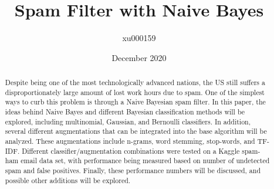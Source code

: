 \documentclass{article}
\title{Spam Filter with Naive Bayes}
\author{xu000159 }
\date{December 2020}
\begin{document}
\maketitle

\begin{abstract}
   Despite being one of the most technologically advanced nations, the US still suffers a disproportionately large amount of lost work hours due to spam. One of the simplest ways to curb this problem is through a Naive Bayesian spam filter. In this paper, the ideas behind Naive Bayes and different Bayesian classification methods will be explored, including multinomial, Gaussian, and Bernoulli classifiers. In addition, several different augmentations that can be integrated into the base algorithm will be analyzed. These augmentations include n-grams, word stemming, stop-words, and TF-IDF. Different classifier/augmentation combinations were tested on a Kaggle spam-ham email data set, with performance being measured based on number of undetected spam and false positives. Finally, these performance numbers will be discussed, and possible other additions will be explored.
\end{abstract}
\end{document}
